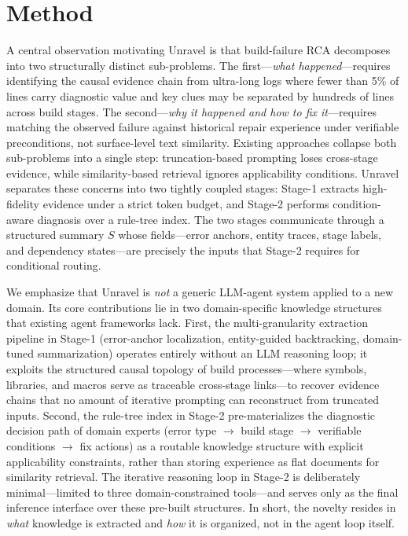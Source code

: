 \documentclass[sigconf,anonymous]{acmart}
\begin{document}
\section{Method}

A central observation motivating Unravel is that build-failure RCA decomposes into two structurally distinct sub-problems. The first---\emph{what happened}---requires identifying the causal evidence chain from ultra-long logs where fewer than 5\% of lines carry diagnostic value and key clues may be separated by hundreds of lines across build stages. The second---\emph{why it happened and how to fix it}---requires matching the observed failure against historical repair experience under verifiable preconditions, not surface-level text similarity. Existing approaches collapse both sub-problems into a single step: truncation-based prompting loses cross-stage evidence, while similarity-based retrieval ignores applicability conditions. Unravel separates these concerns into two tightly coupled stages: Stage-1 extracts high-fidelity evidence under a strict token budget, and Stage-2 performs condition-aware diagnosis over a rule-tree index. The two stages communicate through a structured summary $S$ whose fields---error anchors, entity traces, stage labels, and dependency states---are precisely the inputs that Stage-2 requires for conditional routing.

We emphasize that Unravel is \emph{not} a generic LLM-agent system applied to a new domain. Its core contributions lie in two domain-specific knowledge structures that existing agent frameworks lack. First, the multi-granularity extraction pipeline in Stage-1 (error-anchor localization, entity-guided backtracking, domain-tuned summarization) operates entirely without an LLM reasoning loop; it exploits the structured causal topology of build processes---where symbols, libraries, and macros serve as traceable cross-stage links---to recover evidence chains that no amount of iterative prompting can reconstruct from truncated inputs. Second, the rule-tree index in Stage-2 pre-materializes the diagnostic decision path of domain experts (error type $\to$ build stage $\to$ verifiable conditions $\to$ fix actions) as a routable knowledge structure with explicit applicability constraints, rather than storing experience as flat documents for similarity retrieval. The iterative reasoning loop in Stage-2 is deliberately minimal---limited to three domain-constrained tools---and serves only as the final inference interface over these pre-built structures. In short, the novelty resides in \emph{what} knowledge is extracted and \emph{how} it is organized, not in the agent loop itself.
\end{document}
